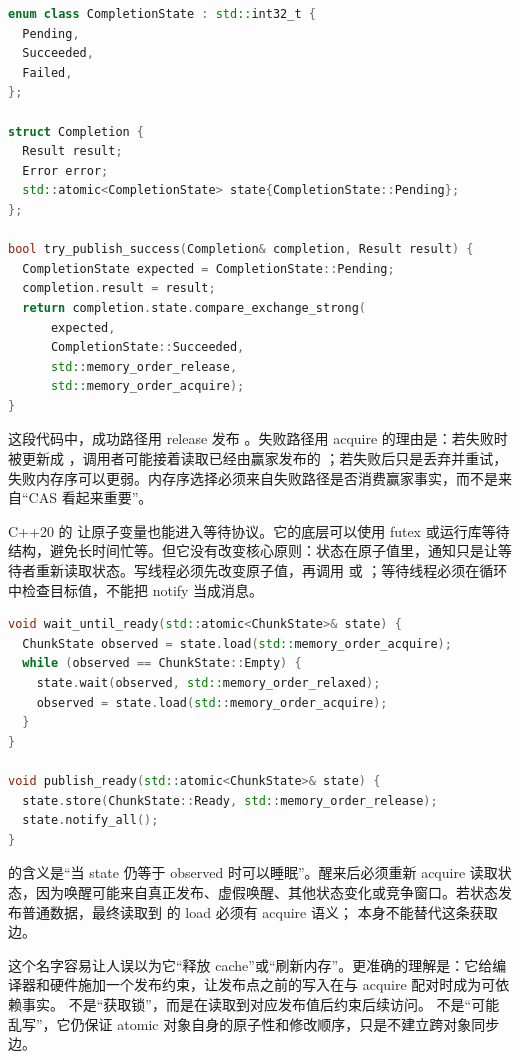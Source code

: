 \begin{lstlisting}[language=C++,caption={CAS 状态机必须说明失败路径要不要读取赢家数据}]
enum class CompletionState : std::int32_t {
  Pending,
  Succeeded,
  Failed,
};

struct Completion {
  Result result;
  Error error;
  std::atomic<CompletionState> state{CompletionState::Pending};
};

bool try_publish_success(Completion& completion, Result result) {
  CompletionState expected = CompletionState::Pending;
  completion.result = result;
  return completion.state.compare_exchange_strong(
      expected,
      CompletionState::Succeeded,
      std::memory_order_release,
      std::memory_order_acquire);
}
\end{lstlisting}

这段代码中，成功路径用 release 发布 。失败路径用 acquire 的理由是：若失败时  被更新成 ，调用者可能接着读取已经由赢家发布的 ；若失败后只是丢弃并重试，失败内存序可以更弱。内存序选择必须来自失败路径是否消费赢家事实，而不是来自“CAS 看起来重要”。

C++20 的  让原子变量也能进入等待协议。它的底层可以使用 futex 或运行库等待结构，避免长时间忙等。但它没有改变核心原则：状态在原子值里，通知只是让等待者重新读取状态。写线程必须先改变原子值，再调用  或 ；等待线程必须在循环中检查目标值，不能把 notify 当成消息。

\begin{lstlisting}[language=C++,caption={atomic::wait 仍然等待状态变化}]
void wait_until_ready(std::atomic<ChunkState>& state) {
  ChunkState observed = state.load(std::memory_order_acquire);
  while (observed == ChunkState::Empty) {
    state.wait(observed, std::memory_order_relaxed);
    observed = state.load(std::memory_order_acquire);
  }
}

void publish_ready(std::atomic<ChunkState>& state) {
  state.store(ChunkState::Ready, std::memory_order_release);
  state.notify_all();
}
\end{lstlisting}

 的含义是“当 state 仍等于 observed 时可以睡眠”。醒来后必须重新 acquire 读取状态，因为唤醒可能来自真正发布、虚假唤醒、其他状态变化或竞争窗口。若状态发布普通数据，最终读取到  的 load 必须有 acquire 语义； 本身不能替代这条获取边。

 这个名字容易让人误以为它“释放 cache”或“刷新内存”。更准确的理解是：它给编译器和硬件施加一个发布约束，让发布点之前的写入在与 acquire 配对时成为可依赖事实。 不是“获取锁”，而是在读取到对应发布值后约束后续访问。 不是“可能乱写”，它仍保证 atomic 对象自身的原子性和修改顺序，只是不建立跨对象同步边。

